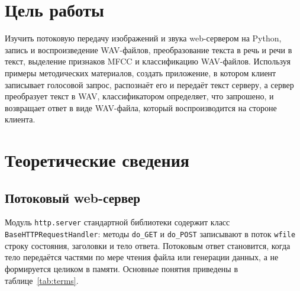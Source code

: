 \documentclass[14pt,a4paper]{extarticle}
\begin{document}

\tableofcontents

\section{Цель работы}

Изучить потоковую передачу изображений и звука web-сервером на Python, запись и
воспроизведение WAV-файлов, преобразование текста в речь и речи в текст, выделение
признаков MFCC и классификацию WAV-файлов. Используя примеры методических материалов,
создать приложение, в котором клиент записывает голосовой запрос, распознаёт его и
передаёт текст серверу, а сервер преобразует текст в WAV, классификатором определяет,
что запрошено, и возвращает ответ в виде WAV-файла, который воспроизводится на стороне
клиента.

\section{Теоретические сведения}

\subsection{Потоковый web-сервер}

Модуль \texttt{http.server} стандартной библиотеки содержит класс
\texttt{BaseHTTPRequestHandler}: методы \texttt{do\_GET} и \texttt{do\_POST} записывают в
поток \texttt{wfile} строку состояния, заголовки и тело ответа. Потоковым ответ
становится, когда тело передаётся частями по мере чтения файла или генерации данных, а
не формируется целиком в памяти. Основные понятия приведены в таблице~\ref{tab:terms}.
\end{document}
